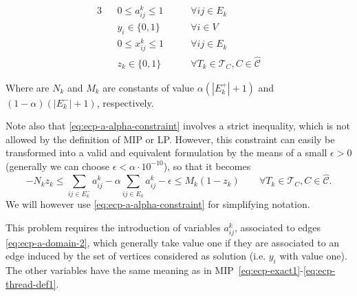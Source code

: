\begin{alignat}{3}
	\label{eq:ecp-a-domain-2}
	                                                                 &                    & 0 \leq
	a_{ij}^{k} \leq 1  \quad\quad                                    & \forall ij \in E_k                                                                                                                                                        \\
	\label{eq:ecp-vertex-def2}
	                                                                 &                    & y _{i}                                                             \in  \{0, 1\} \quad\quad              & \forall i \in V                           \\
	\label{eq:ecp-edge-def2}
	                                                                 &                    & 0 \leq x _{ij} ^{k}                                                \leq 1 \quad\quad                     & \forall ij \in E_k                        \\
	\label{eq:ecp-z-domain-2}
	                                                                 &                    & z _{k}                                                             \in  \{0, 1\} \quad\quad              & \forall T_{k} \in \mathcal{T} _{C}, C \in
	\hat{\mathcal{C}}
\end{alignat}

Where are $N_k$ and $M_k$ are constants of value $\alpha (|E_k^{+}| + 1)$ and $(1 -
	\alpha ) (|E^{-}_k| + 1)$, respectively.

Note also that \eqref{eq:ecp-a-alpha-constraint} involves a strict inequality,
which is not allowed by the definition of
\acrshort{MIP} or \acrshort{LP}. However, this constraint can easily be
transformed into a valid
and equivalent formulation by the means of a small $\epsilon > 0$ (generally
we can choose $\epsilon < \alpha \cdot 10^{-10}$), so that
it becomes
\begin{equation*}
	-N_k z_k \leq \sum^{}_{ij \in E^-_k} a_{ij}^{k}  - \alpha \sum^{}_{ij
		\in E_k}
	a_{ij} ^{k} - \epsilon \leq M_{k} (1 - z_{k})  \quad\quad \forall T_{k} \in
	\mathcal{T} _{C}, C \in \mathcal{\hat{C}}.
\end{equation*}
We will however use \eqref{eq:ecp-a-alpha-constraint} for simplifying notation.

This problem requires the introduction of variables $a_{ij}^{k}$,
associated to edges \eqref{eq:ecp-a-domain-2}, which
generally take value one if they are associated to an edge induced by the
set of vertices considered as solution (i.e. $y_i$ with value one). The
other variables have the same meaning as in MIP~\eqref{eq:ecp-exact1}-\eqref{eq:ecp-thread-def1}.

